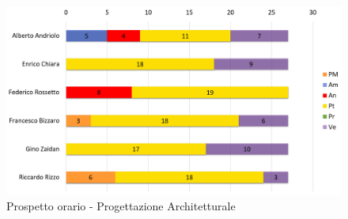 \begin{figure}[H]
	\centering
	\includegraphics[width= 14cm]{immagini/pa_istogramma.png}
	\caption{Prospetto orario - Progettazione Architetturale}
\end{figure}
\newpage

